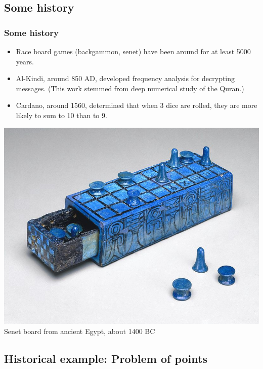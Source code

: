 
\subsection{Some history}


\begin{frame}
\frametitle{Some history}

{
\begin{itemize}
\item Race board games (backgammon, senet) have been around for at least 5000 years.
\item Al-Kindi, around 850 AD, developed frequency analysis for decrypting messages. (This work stemmed from deep numerical study of the Quran.)
\item Cardano, around 1560, determined that when 3 dice are rolled, they are more likely to sum to 10 than to 9.

\end{itemize}
}
{
\includegraphics[scale=0.15]{2-1_define_probability/figures/senet}
\\Senet board from ancient Egypt, about 1400 BC
}
\end{frame}


\subsection{Historical example: Problem of points}

